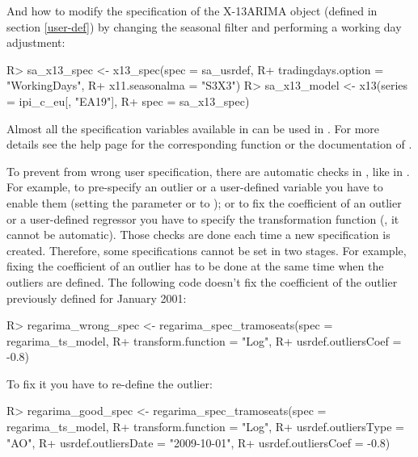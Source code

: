 \documentclass[article]{jss}
\begin{document}
And how to modify the specification of the X-13ARIMA object
 (defined in section \ref{user-def}) by changing the
seasonal filter and performing a working day adjustment:

\begin{CodeChunk}

\begin{CodeInput}
R> sa_x13_spec <- x13_spec(spec = sa_usrdef,
R+                          tradingdays.option = "WorkingDays",
R+                          x11.seasonalma = "S3X3")
R> sa_x13_model <- x13(series = ipi_c_eu[, "EA19"],
R+                     spec = sa_x13_spec)
\end{CodeInput}
\end{CodeChunk}

Almost all the specification variables available in 
can be used in . For more details see the help page for
the corresponding function or the documentation of .

To prevent from wrong user specification, there are automatic checks in
, like in . For example, to
pre-specify an outlier or a user-defined variable you have to enable
them (setting the parameter  or
 to ); or to fix the coefficient of
an outlier or a user-defined regressor you have to specify the
transformation function (, it cannot be
automatic). Those checks are done each time a new specification is
created. Therefore, some specifications cannot be set in two stages. For
example, fixing the coefficient of an outlier has to be done at the same
time when the outliers are defined. The following code doesn't fix the
coefficient of the outlier previously defined for January 2001:

\begin{CodeChunk}

\begin{CodeInput}
R> regarima_wrong_spec <- regarima_spec_tramoseats(spec = regarima_ts_model,
R+              transform.function = "Log",
R+              usrdef.outliersCoef =  -0.8)
\end{CodeInput}
\end{CodeChunk}

To fix it you have to re-define the outlier:

\begin{CodeChunk}

\begin{CodeInput}
R> regarima_good_spec <- regarima_spec_tramoseats(spec = regarima_ts_model,
R+              transform.function = "Log",
R+              usrdef.outliersType = "AO",
R+              usrdef.outliersDate = "2009-10-01",
R+              usrdef.outliersCoef =  -0.8)
\end{CodeInput}
\end{CodeChunk}
\end{document}
